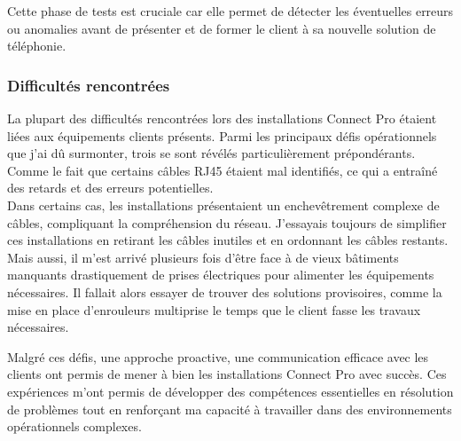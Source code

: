 \documentclass[12pt, a4paper]{article}
\begin{document}
Cette phase de tests est cruciale car elle permet 
de détecter les éventuelles erreurs ou anomalies
avant de présenter et de former le client 
à sa nouvelle solution de téléphonie.\\

\subsubsection{Difficultés rencontrées}
La plupart des difficultés rencontrées lors des installations
Connect Pro étaient liées aux équipements clients présents.
Parmi les principaux défis opérationnels que j'ai dû surmonter,
trois se sont révélés particulièrement prépondérants. 
Comme le fait que certains câbles RJ45 étaient mal identifiés, ce qui a entraîné
des retards et des erreurs potentielles.\\

Dans certains cas, les installations présentaient un enchevêtrement
complexe de câbles, compliquant la compréhension du réseau.
J'essayais toujours de simplifier ces installations en retirant les câbles
inutiles et en ordonnant les câbles restants.\\

Mais aussi, il m'est arrivé plusieurs fois d'être face à de vieux bâtiments 
manquants drastiquement de prises électriques pour alimenter les équipements
nécessaires. Il fallait alors essayer de trouver des solutions 
provisoires, comme la mise en 
place d'enrouleurs multiprise le temps que le client fasse les travaux nécessaires. 

Malgré ces défis, une approche proactive, une communication efficace
avec les clients ont permis de mener à
bien les installations Connect Pro avec succès. Ces
expériences m'ont permis de développer des compétences essentielles
en résolution de problèmes tout en
renforçant ma capacité à travailler dans des environnements
opérationnels complexes.

\newpage
\end{document}

